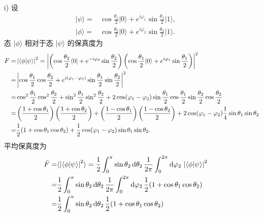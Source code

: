 \documentclass{assignment}
\begin{document}
\begin{sol}
    \begin{itemize}
        \item[i)] 设
        \begin{align}
            \lvert\psi\rangle=&\cos\frac{\theta_1}{2}\lvert 0\rangle+e^{i\varphi_1}\sin\frac{\theta_1}{2}\lvert 1\rangle,\\
            \lvert\phi\rangle=&\cos\frac{\theta_2}{2}\lvert 0\rangle+e^{i\varphi_2}\sin\frac{\theta_2}{2}\lvert 1\rangle.
        \end{align}
        态 $\lvert\phi\rangle$ 相对于态 $\lvert\psi\rangle$ 的保真度为
        \begin{align}
            \notag F=&\left\lvert\langle\phi\vert\psi\rangle\right\rvert^2=\left\lvert\left(\cos\frac{\theta_2}{2}\langle 0\rvert+e^{-i\varphi_2}\sin\frac{\theta_2}{2}\right)\left(\cos\frac{\theta_1}{2}\lvert 0\rangle+e^{i\varphi_1}\sin\frac{\theta_1}{2}\right)\right\rvert^2\\
            \notag=&\left\lvert\cos\frac{\theta_1}{2}\cos\frac{\theta_2}{2}+e^{i(\varphi_1-\varphi_2)}\sin\frac{\theta_1}{2}\sin\frac{\theta_2}{2}\right\rvert^2\\
            \notag=&\cos^2\frac{\theta_1}{2}\cos^2\frac{\theta_2}{2}+\sin^2\frac{\theta_1}{2}\sin^2\frac{\theta_2}{2}+2\cos(\varphi_1-\varphi_2)\sin\frac{\theta_1}{2}\cos\frac{\theta_1}{2}\sin\frac{\theta_2}{2}\cos\frac{\theta_2}{2}\\
            \notag=&\left(\frac{1+\cos\theta_1}{2}\right)\left(\frac{1+\cos\theta_2}{2}\right)+\left(\frac{1-\cos\theta_1}{2}\right)\left(\frac{1-\cos\theta_2}{2}\right)+2\cos(\varphi_1-\varphi_2)\frac{1}{4}\sin\theta_1\sin\theta_2\\
            \notag=&\frac{1}{2}(1+\cos\theta_1\cos\theta_2)+\frac{1}{2}\cos(\varphi_1-\varphi_2)\sin\theta_1\sin\theta_2.
        \end{align}
        平均保真度为
        \begin{align}
            \notag\bar{F}=&\langle\abs{\langle\phi\vert\psi\rangle}^2\rangle=\frac{1}{2}\int_0^{\pi}\sin\theta_2\,\mathrm{d}\theta_2\,\frac{1}{2\pi}\int_0^{2\pi}\mathrm{d}\varphi_2\,\abs{\langle\phi\vert\psi\rangle}^2\\
            \notag=&\frac{1}{2}\int_0^{\pi}\sin\theta_2\,\mathrm{d}\theta_2\,\frac{1}{2\pi}\int_0^{2\pi}\mathrm{d}\varphi_2\,\frac{1}{2}(1+\cos\theta_1\cos\theta_2)\\
            \notag=&\frac{1}{2}\int_0^{\pi}\sin\theta_2\,\mathrm{d}\theta_2\,\frac{1}{2}(1+\cos\theta_1\cos\theta_2)\\

\end{align}
\end{itemize}
\end{sol}
\end{document}
